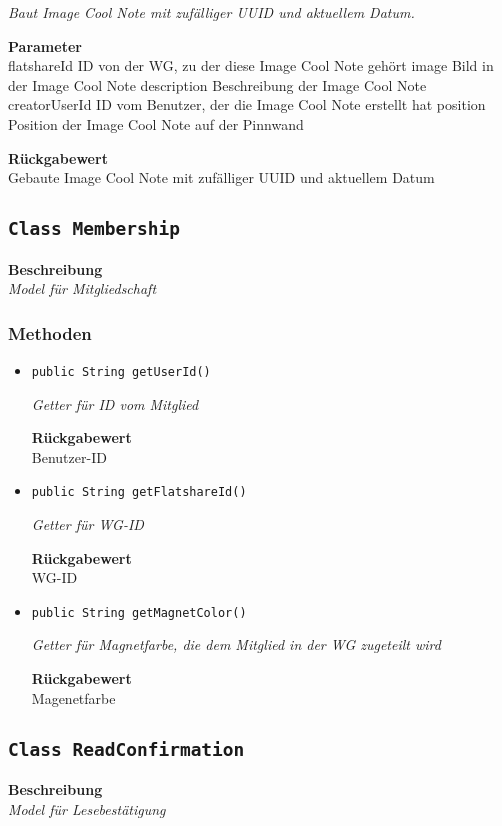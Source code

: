 \begin{itemize}
    	\textit{Baut Image Cool Note mit zufälliger UUID und aktuellem Datum.}
    	
    	\textbf{Parameter} \\
    	flatshareId ID von der WG, zu der diese Image Cool Note gehört
    	image Bild in der Image Cool Note
    	description Beschreibung der Image Cool Note
    	creatorUserId ID vom Benutzer, der die Image Cool Note erstellt hat
    	position Position der Image Cool Note auf der Pinnwand
    	
    	\textbf{Rückgabewert} \\
    	Gebaute Image Cool Note mit zufälliger UUID und aktuellem Datum
    \end{itemize}
    \subsection{\texttt{Class Membership}}
    \textbf{Beschreibung} \\
    \textit{Model für Mitgliedschaft}
    \subsubsection{Methoden}
    \begin{itemize}
    	\item{\texttt{public String getUserId()}}
    	
    	\textit{Getter für ID vom Mitglied}
    	
    	
    	
    	\textbf{Rückgabewert} \\
    	Benutzer-ID        \item{\texttt{public String getFlatshareId()}}
    	
    	\textit{Getter für WG-ID}
    	
    	
    	
    	\textbf{Rückgabewert} \\
    	WG-ID        \item{\texttt{public String getMagnetColor()}}
    	
    	\textit{Getter für Magnetfarbe, die dem Mitglied in der WG zugeteilt wird}
    	
    	
    	
    	\textbf{Rückgabewert} \\
    	Magenetfarbe
    \end{itemize}
    \subsection{\texttt{Class ReadConfirmation}}
    \textbf{Beschreibung} \\
    \textit{Model für Lesebestätigung}
